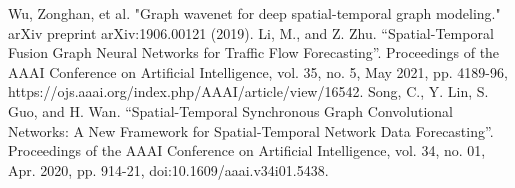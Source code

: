 \documentclass[conference]{IEEEtran}
\begin{document}
\begin{thebibliography}{00}
 Wu, Zonghan, et al. "Graph wavenet for deep spatial-temporal graph modeling." arXiv preprint arXiv:1906.00121 (2019).
 Li, M., and Z. Zhu. “Spatial-Temporal Fusion Graph Neural Networks for Traffic Flow Forecasting”. Proceedings of the AAAI Conference on Artificial Intelligence, vol. 35, no. 5, May 2021, pp. 4189-96, https://ojs.aaai.org/index.php/AAAI/article/view/16542.
 Song, C., Y. Lin, S. Guo, and H. Wan. “Spatial-Temporal Synchronous Graph Convolutional Networks: A New Framework for Spatial-Temporal Network Data Forecasting”. Proceedings of the AAAI Conference on Artificial Intelligence, vol. 34, no. 01, Apr. 2020, pp. 914-21, doi:10.1609/aaai.v34i01.5438.

\end{thebibliography}
\end{document}
